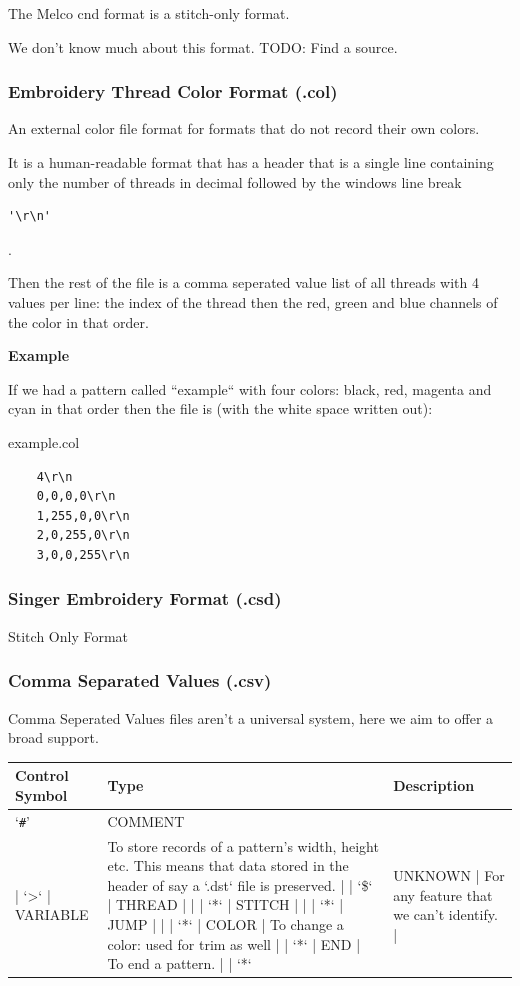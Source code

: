 \documentclass[a4paper, 11pt]{report}
\begin{document}
The Melco cnd format is a stitch-only format.

We don't know much about this format. TODO: Find a source.

\subsubsection{Embroidery Thread Color Format (.col)}

An external color file format for formats that do not record their own colors. 

It is a human-readable format that has a header that is a single line containing only the number of threads in decimal followed by the windows line break \begin{verbatim}'\r\n'\end{verbatim}.

Then the rest of the file is a comma seperated value list of all threads with 4 values per line: the index of the thread then the red, green and blue channels of the color in that order.

\begin{flushleft}
\textbf{Example}
\end{flushleft}

If we had a pattern called ``example`` with four colors: black, red, magenta and 
cyan in that order then the file is (with the white space written out):

example.col

\begin{verbatim}
    4\r\n
    0,0,0,0\r\n
    1,255,0,0\r\n
    2,0,255,0\r\n
    3,0,0,255\r\n
\end{verbatim}

\subsubsection{Singer Embroidery Format (.csd)}

Stitch Only Format

\subsubsection{Comma Separated Values (.csv)}

Comma Seperated Values files aren't a universal system, here we aim to
offer a broad support.

\begin{tabular}{l l l}
Control Symbol & Type & Description \\
\hline
`\texttt{\#}' & COMMENT & \\
| `>` | VARIABLE & To store records of a pattern's width, height etc. This means that data stored in the header of say a `.dst` file is preserved. |
| `\$` | THREAD | |
| `*` | STITCH | |
| `*` | JUMP | |
| `*` | COLOR | To change a color: used for trim as well |
| `*` | END | To end a pattern. |
| `*` & UNKNOWN | For any feature that we can't identify. |
\end{tabular}
\end{document}
